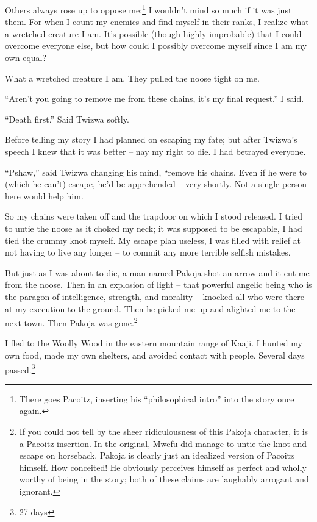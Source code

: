 Others always rose up to oppose me;\footnote{There goes Pacoitz, inserting his ``philosophical intro'' into the story once again.}
I wouldn't mind so much if it was just them.
For when I count my enemies and find myself in their ranks, I realize what a wretched creature I am.
It's possible (though highly improbable) that I could overcome everyone else, but how could I possibly overcome myself since I am my own equal?

What a wretched creature I am. They pulled the noose tight on me.

``Aren't you going to remove me from these chains, it's my final request.'' I said.

``Death first.'' Said Twizwa softly.

Before telling my story I had planned on escaping my fate; but after Twizwa's speech I knew that it was better -- nay my right to die. I had betrayed everyone.

``Pshaw,'' said Twizwa changing his mind, ``remove his chains. Even if he were to (which he can't) escape, he'd be apprehended -- very shortly. Not a single person here would help him.

So my chains were taken off and the trapdoor on which I stood released. I tried to untie the noose as it choked my neck; it was supposed to be escapable, I had tied the crummy knot myself. My escape plan useless, I was filled with relief at not having to live any longer -- to commit any more terrible selfish mistakes.

But just as I was about to die, a man named Pakoja shot an arrow and it cut me from the noose. Then in an explosion of light -- that powerful angelic being who is the paragon of intelligence, strength, and morality -- knocked all who were there at my execution to the ground. Then he picked me up and alighted me to the next town. Then Pakoja was gone.\footnote{If you could not tell by the sheer ridiculousness of this Pakoja character, it is a Pacoitz insertion. In the original, Mwefu did manage to untie the knot and escape on horseback. Pakoja is clearly just an idealized version of Pacoitz himself. How conceited! He obviously perceives himself as perfect and wholly worthy of being in the story; both of these claims are laughably arrogant and ignorant.}

I fled to the Woolly Wood in the eastern mountain range of Kaaji. I hunted my own food, made my own shelters, and avoided contact with people. Several days passed.\footnote{27 days}

\tbreak

